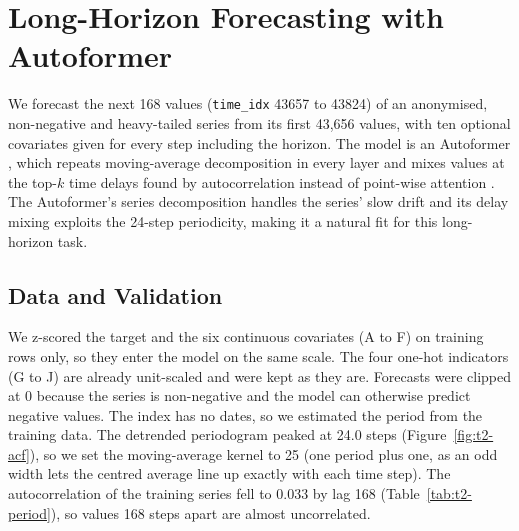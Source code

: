 \documentclass{article}
\begin{document}
\begin{table}[!htbp]
  \centering
  \caption{Validation RMSE (m/s$^2$) and MSE ((m/s$^2$)$^2$) of all fitted models, with trainable parameters and fitting time in seconds (cell 32 summary).}
  \label{tab:t1-designs}
  \resizebox{0.85\linewidth}{!}{}
\end{table}

\begin{table}[!htbp]
  \centering
  \caption{Validation RMSE (m/s$^2$) at forecast steps $h = 1, 12, 24, 48$ (Output 4.2).}
  \label{tab:t1-horizon}
  \resizebox{0.95\linewidth}{!}{}
\end{table}

\FloatBarrier
\section{Long-Horizon Forecasting with Autoformer}
\label{sec:t2}

We forecast the next 168 values (\texttt{time\_idx} 43657 to 43824) of an anonymised, non-negative and heavy-tailed series from its first 43,656 values, with ten optional covariates given for every step including the horizon. The model is an Autoformer \citep{wu2021autoformer}, which repeats moving-average decomposition in every layer and mixes values at the top-$k$ time delays found by autocorrelation instead of point-wise attention \citep{vaswani2017attention}. The Autoformer's series decomposition handles the series' slow drift and its delay mixing exploits the 24-step periodicity, making it a natural fit for this long-horizon task.

\subsection{Data and Validation}
\label{subsec:t2-data}

We z-scored the target and the six continuous covariates (A to F) on training rows only, so they enter the model on the same scale. The four one-hot indicators (G to J) are already unit-scaled and were kept as they are. Forecasts were clipped at 0 because the series is non-negative and the model can otherwise predict negative values. The index has no dates, so we estimated the period from the training data. The detrended periodogram peaked at 24.0 steps (Figure~\ref{fig:t2-acf}), so we set the moving-average kernel to 25 (one period plus one, as an odd width lets the centred average line up exactly with each time step). The autocorrelation of the training series fell to 0.033 by lag 168 (Table~\ref{tab:t2-period}), so values 168 steps apart are almost uncorrelated.
\end{document}
